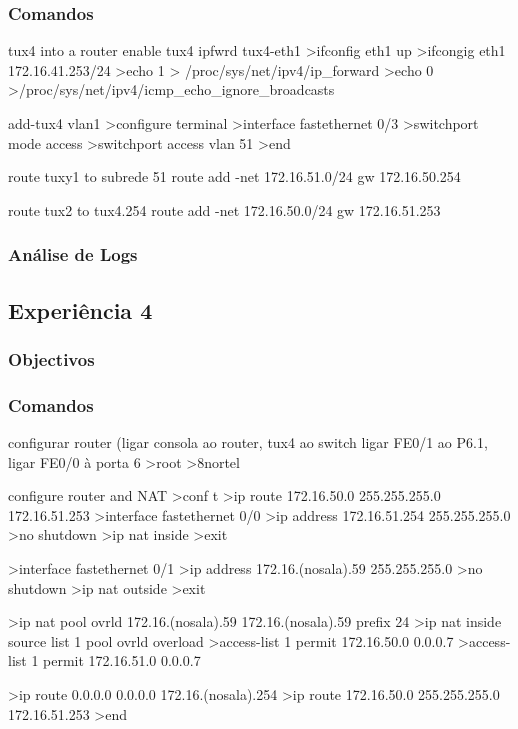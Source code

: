 \documentclass[a4paper,11pt]{article}
\begin{document}
\subsubsection{Comandos}
tux4 into a router
enable tux4 ipfwrd
tux4-eth1
>ifconfig eth1 up
>ifcongig eth1 172.16.41.253/24
>echo 1 > /proc/sys/net/ipv4/ip_forward
>echo 0 >/proc/sys/net/ipv4/icmp_echo_ignore_broadcasts

add-tux4 vlan1
>configure terminal
>interface fastethernet 0/3
>switchport mode access
>switchport access vlan 51
>end

route tuxy1 to subrede 51
route add -net 172.16.51.0/24 gw 172.16.50.254

route tux2 to tux4.254
route add -net 172.16.50.0/24 gw 172.16.51.253

\subsubsection{Análise de Logs}

\subsection{Experiência 4}
\subsubsection{Objectivos}

\subsubsection{Comandos}
configurar router (ligar consola ao router, tux4 ao switch ligar FE0/1 ao P6.1, ligar FE0/0 à porta 6
>root
>8nortel

configure router and NAT
>conf t
>ip route 172.16.50.0 255.255.255.0 172.16.51.253 
>interface fastethernet 0/0 
>ip address 172.16.51.254 255.255.255.0 
>no shutdown 
>ip nat inside 
>exit 

>interface fastethernet 0/1 
>ip address 172.16.(nosala).59 255.255.255.0 
>no shutdown 
>ip nat outside 
>exit 

>ip nat pool ovrld 172.16.(nosala).59 172.16.(nosala).59 prefix 24
>ip nat inside source list 1 pool ovrld overload 
>access-list 1 permit 172.16.50.0 0.0.0.7 
>access-list 1 permit 172.16.51.0 0.0.0.7 

>ip route 0.0.0.0 0.0.0.0 172.16.(nosala).254 
>ip route 172.16.50.0 255.255.255.0 172.16.51.253 
>end
\end{document}
